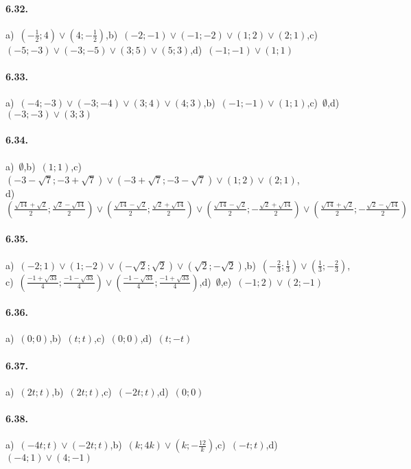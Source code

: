 \paragraph{6.32.} a)~$\left(-\frac 1 2;4\right)\vee\left(4;-\frac 1 2\right)$,\quad b)~$(-2;-1)\vee(-1;-2)\vee(1;2)\vee(2;1)$,\quad c)~$(-5;-3)\vee(-3;-5)\vee(3;5)\vee(5;3)$,\quad d)~$(-1;-1)\vee(1;1)$

\paragraph{6.33.} a)~$(-4;-3)\vee(-3;-4)\vee(3;4)\vee(4;3)$,\quad b)~$(-1;-1)\vee(1;1)$,\quad c)~$\emptyset$,\quad d)~$(-3;-3)\vee(3;3)$

\paragraph{6.34.} a)~$\emptyset$,\quad b)~$(1;1)$,\quad c)~$(-3-\sqrt 7;-3+\sqrt 7)\vee(-3+\sqrt 7;-3-\sqrt 7)\vee(1;2)\vee(2;1)$,\protect\\
\quad d)~$\left(\frac{\sqrt{14}+\sqrt 2} 2;\frac{\sqrt 2-\sqrt{14}} 2\right)\vee\left(\frac{\sqrt{14}-\sqrt 2} 2;\frac{\sqrt 2+\sqrt{14}} 2\right)\vee\left(\frac{\sqrt{14}-\sqrt 2} 2;-\frac{\sqrt 2+\sqrt{14}} 2\right)\vee\left(\frac{\sqrt{14}+\sqrt 2} 2;-\frac{\sqrt 2-\sqrt{14}} 2\right)$

\paragraph{6.35.} a)~$(-2;1)\vee(1;-2)\vee(-\sqrt {2};\sqrt{2})\vee(\sqrt {2};-\sqrt{2})$,\quad b)~$\left(-\frac 2 3;\frac 1 3\right)\vee\left(\frac 1 3;-\frac 2 3\right)$,\protect\\
\quad c)~$\left(\frac{-1+\sqrt{33}} 4;\frac{-1-\sqrt{33}} 4\right)\vee \left(\frac{-1-\sqrt{33}} 4;\frac{-1+\sqrt{33}} 4\right)$,\quad d)~$\emptyset$,\quad e)~$(-1;2)\vee(2;-1)$

\paragraph{6.36.} a)~$(0;0)$,\quad b)~$(t;t)$,\quad c)~$(0;0)$,\quad d)~$(t;-t)$

\paragraph{6.37.} a)~$(2t;t)$,\quad b)~$(2t;t)$,\quad c)~$(-2t;t)$,\quad d)~$(0;0)$

\paragraph{6.38.} a)~$(-4t;t)\vee(-2t;t)$,\quad b)~$(k;4k)\vee(k;-\frac{1 2}k)$,\quad c)~$(-t;t)$,\quad d)~$(-4;1)\vee(4;-1)$

